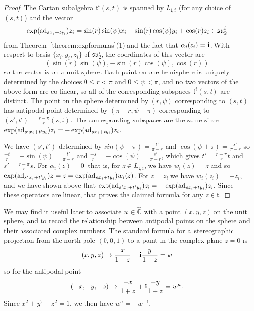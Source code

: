 \documentclass[pdftex]{sigma}
\numberwithin{equation}{section}
\def\C{{\mathbb C}}
\def\bi{{\bf i}}
\def\ft{\mathfrak{t}}
\def\fsu{\mathfrak{su}}
\begin{document}
\begin{proof}
The Cartan subalgebra $\ft^i(s,t)$ is spanned by $L_{\ft,i}$ (for any choice of $(s,t)$) and the vector
\[\exp( {\rm ad}_{sx_i+ty_i}) z_i= \sin(r)\sin(\psi)x_i - \sin(r) \cos(\psi) y_i + \cos(r) z_i \in \fsu_2^i\]
from Theorem~\ref{theorem:expformulas}(1) and the fact that $\alpha_i(z_i) = \bi$.
With respect to basis $\{x_i,y_i,z_i\}$ of $\fsu_2^i$, the coordinates of this vector are
\[(\sin(r)\sin(\psi), - \sin(r) \cos(\psi), \cos(r))\]
so the vector is on a unit sphere. Each point on one hemisphere is uniquely determined by the choices
$0\leq r < \pi$ and $0\leq\psi<\pi$, and no two vectors of the above form are co-linear, so all of the corresponding subspaces $\ft^i(s,t)$ are distinct. The point on the sphere determined by $(r,\psi)$ corresponding to $(s,t)$ has antipodal point determined by $(\pi-r,\psi+\pi)$ corresponding to $(s',t') = \frac{r-\pi}{r}(s,t)$. The corresponding subspaces are the same since
$\exp( {\rm ad}_{s'x_i+t'y_i}) z_i = - \exp( {\rm ad}_{sx_i+ty_i}) z_i$.

We have $(s',t')$ determined by $sin(\psi+\pi) = \frac{t'}{\pi-r}$ and $\cos(\psi+\pi) = \frac{s'}{\pi-r}$ so $\frac{-t}{r} = -\sin(\psi) = \frac{t'}{\pi-r}$ and $\frac{-s}{r} = -\cos(\psi) = \frac{s'}{\pi-r}$, which gives $t' = \frac{r-\pi}{r} t$ and $s' = \frac{r-\pi}{r} s$. For $\alpha_i(z) = 0$, that is, for $z\in L_{\ft,i}$, we have $w_i(z) = z$ and so $\exp( {\rm ad}_{s'x_i+t'y_i}) z = z = \exp( {\rm ad}_{sx_i+ty_i}) w_i(z)$. For $z = z_i$ we have $w_i(z_i) = -z_i$, and we have shown above that $\exp( {\rm ad}_{s'x_i+t'y_i}) z_i = - \exp( {\rm ad}_{sx_i+ty_i}) z_i$. Since these operators are linear, that proves the claimed formula for any $z\in\ft$.
\end{proof}

\begin{Remark}We may find it useful later to associate $w\in\hat\C$ with a point $(x,y,z)$ on the unit sphere, and to record the relationship between antipodal points on the sphere and their associated complex numbers. The standard formula for a~stereographic projection from the north pole $(0,0,1)$ to a point in the complex plane $z = 0$ is
\[(x,y,z) \to \frac{x}{1-z} + \bi \frac{y}{1-z} = w\]
so for the antipodal point
\[(-x,-y,-z) \to \frac{-x}{1+z} + \bi \frac{-y}{1+z} = w^a.\]
Since $x^2 + y^2 + z^2 = 1$, we then have $w^a = -{\bar w}^{-1}$.
\end{Remark}
\end{document}
